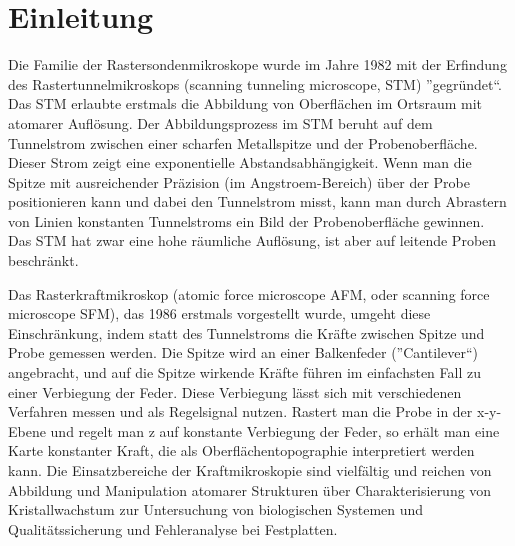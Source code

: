 \chapter{Einleitung}

Die Familie der Rastersondenmikroskope wurde im Jahre 1982 mit der Erfindung des Rastertunnelmikroskops (scanning tunneling microscope, STM) ”gegründet“.
Das STM erlaubte erstmals die Abbildung von Oberflächen im Ortsraum mit atomarer Auflösung.
Der Abbildungsprozess im STM beruht auf dem Tunnelstrom zwischen einer scharfen Metallspitze und der Probenoberfläche. 
Dieser Strom zeigt eine exponentielle Abstandsabhängigkeit. 
Wenn man die Spitze mit ausreichender Präzision (im Angstroem-Bereich) über der Probe positionieren kann und dabei den Tunnelstrom misst, kann man durch Abrastern von Linien konstanten Tunnelstroms ein Bild der Probenoberfläche gewinnen. 
Das STM hat zwar eine hohe räumliche Auflösung, ist aber auf leitende Proben beschränkt.

Das Rasterkraftmikroskop (atomic force microscope AFM, oder scanning force microscope SFM), das 1986 erstmals vorgestellt wurde, umgeht diese Einschränkung, indem statt des Tunnelstroms die Kräfte zwischen Spitze und Probe gemessen werden. 
Die Spitze wird an einer Balkenfeder (”Cantilever“) angebracht, und auf die Spitze wirkende Kräfte führen im einfachsten Fall zu einer Verbiegung der Feder. Diese Verbiegung lässt sich mit verschiedenen  Verfahren  messen  und  als  Regelsignal  nutzen.
Rastert  man  die  Probe in  der x-y-Ebene  und  regelt  man z auf  konstante  Verbiegung  der  Feder, so erhält man eine Karte konstanter Kraft, die als Oberflächentopographie interpretiert werden kann.
Die Einsatzbereiche der Kraftmikroskopie sind vielfältig und reichen von Abbildung  und  Manipulation  atomarer  Strukturen über  Charakterisierung von Kristallwachstum zur Untersuchung von biologischen Systemen und Qualitätssicherung und Fehleranalyse bei Festplatten.
